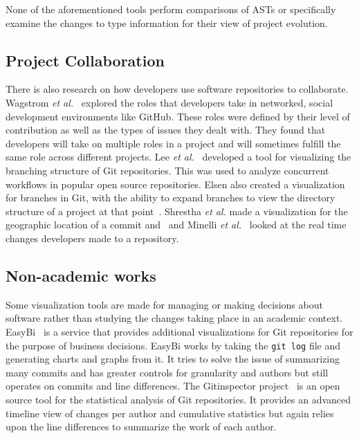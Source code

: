 None of the aforementioned tools perform comparisons of ASTs or specifically examine the changes to type information for their view of project evolution.

\subsection{Project Collaboration}

There is also research on how developers use software repositories to collaborate. Wagstrom \textit{et al.}~\cite{Patrick:Wagstrom:2012} explored the roles that developers take in networked, social development environments like GitHub. These roles were defined by their level of contribution as well as the types of issues they dealt with. They found that developers will take on multiple roles in a project and will sometimes fulfill the same role across different projects. Lee \textit{et al.}~\cite{lee2013} developed a tool for visualizing the branching structure of Git repositories. This was used to analyze concurrent workflows in popular open source repositories. Elsen also created a visualization for branches in Git, with the ability to expand branches to view the directory structure of a project at that point~\cite{6650522}.   Shrestha \textit{et al.} made a visualization for the geographic location of a commit and~\cite{6650532} and Minelli \textit{et al.}~\cite{6980226} looked at the real time changes developers made to a repository.

\subsection{Non-academic works}

Some visualization tools are made for managing or making decisions about software rather than studying the changes taking place in an academic context. EasyBi~\cite{EasyBi} is a service that provides additional visualizations for Git repositories for the purpose of business decisions. EasyBi works by taking the \texttt{git log} file and generating charts and graphs from it. It tries to solve the issue of summarizing many commits and has greater controls for granularity and authors but still operates on commits and line differences. The Gitinspector project~\cite{Gitinspector} is an open source tool for the statistical analysis of Git repositories. It provides an advanced timeline view of changes per author and cumulative statistics but again relies upon the line differences to summarize the work of each author.

